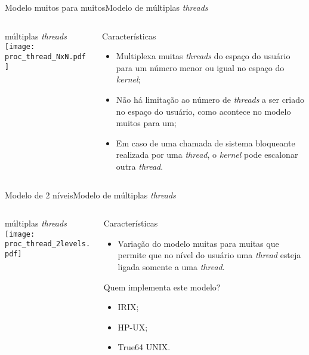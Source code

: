 \begin{frame}{Modelo muitos para muitos}{Modelo de múltiplas {\em threads}}
  \begin{columns}
    \begin{column}{0.4\textwidth}
      \begin{block}{múltiplas \em threads}
        \texttt{[image: proc\_thread\_NxN.pdf]}
      \end{block}
    \end{column}
    \begin{column}{0.6\textwidth}
      \begin{block}{Características}
        \begin{itemize}
        \item Multiplexa muitas {\em threads} do espaço do usuário
          para um número menor ou igual no espaço do {\em kernel};
        \item Não há limitação ao número de {\em threads} a ser criado
          no espaço do usuário, como acontece no modelo muitos para um;
        \item Em caso de uma chamada de sistema bloqueante realizada por 
           uma {\em thread}, o {\em kernel} pode escalonar outra {\em thread}.
        \end{itemize}
      \end{block}
      
    \end{column}
  \end{columns}
\end{frame}

\begin{frame}{Modelo de 2 níveis}{Modelo de múltiplas {\em threads}}
  \begin{columns}
    \begin{column}{0.45\textwidth}
      \begin{block}{múltiplas \em threads}
        \texttt{[image: proc\_thread\_2levels.pdf]}
      \end{block}
    \end{column}
    \begin{column}{0.55\textwidth}
      \begin{block}{Características}
        \begin{itemize}
        \item Variação do modelo muitas para muitas que permite que no
          nível do usuário uma {\em thread} esteja ligada somente a
          uma {\em thread}.
        \end{itemize}
      \end{block}
        \begin{block}{Quem implementa este modelo?}
          \begin{itemize}
          \item {\sc IRIX};
          \item {\sc HP-UX};
          \item True64 {\sc UNIX}.
          \end{itemize}
        \end{block}
    \end{column}
  \end{columns}
\end{frame}
